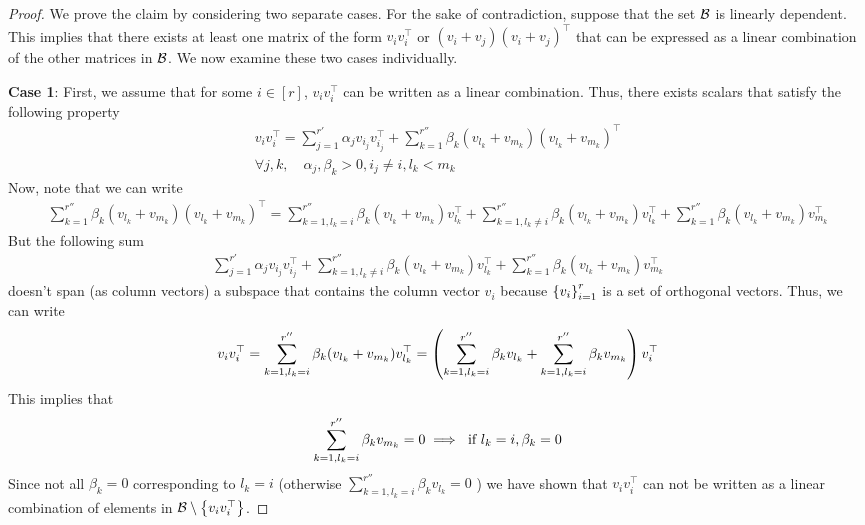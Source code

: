 \begin{proof}
    We prove the claim by considering two separate cases. For the sake of contradiction, suppose that the set ${\mathcal{B}}$ is linearly dependent. This implies that there exists at least one matrix of the form $v_i v_i^{\top}$ or $(v_i + v_j)(v_i + v_j)^{\top}$ that can be expressed as a linear combination of the other matrices in ${\mathcal{B}}$. We now examine these two cases individually.
    
    \textbf{Case 1}: First, we assume that for some $i \in [r]$, $v_iv_i^{\top}$ can be written as a linear combination. Thus, there exists scalars that satisfy the following property
    \begin{gather}
        v_iv_i^{\top} = \sum_{j = 1}^{r'} \alpha_{j}v_{i_j}v_{i_j}^{\top} + \sum_{k = 1}^{r''} \beta_{k}(v_{l_k} + v_{m_k})(v_{l_k} + v_{m_k})^{\top}\\
        \forall j,k,\quad \alpha_j, \beta_k > 0, i_j \neq i, l_k < m_k
    \end{gather}
    Now, note that we can write
    \begin{align*}
       \sum_{k = 1}^{r''} \beta_{k}(v_{l_k} + v_{m_k})(v_{l_k} + v_{m_k})^{\top} =  \sum_{k = 1, l_k = i}^{r''} \beta_{k}(v_{l_k} + v_{m_k})v_{l_k}^{\top} + \sum_{k = 1, l_k \neq i}^{r''} \beta_{k}(v_{l_k} + v_{m_k})v_{l_k}^{\top} + \sum_{k = 1}^{r''} \beta_{k}(v_{l_k} + v_{m_k})v_{m_k}^{\top}
    \end{align*}
    But the following sum 
    \begin{align*}
        \sum_{j = 1}^{r'} \alpha_{j}v_{i_j}v_{i_j}^{\top} + \sum_{k = 1, l_k \neq i}^{r''} \beta_{k}(v_{l_k} + v_{m_k})v_{l_k}^{\top} + \sum_{k = 1}^{r''} \beta_{k}(v_{l_k} + v_{m_k})v_{m_k}^{\top}
    \end{align*}
    doesn't span (as column vectors) a subspace that contains the column vector $v_i$ because $\left\{v_i\right\}_{i=1}^r$ is a set of orthogonal vectors. Thus, we can write
    \begin{align}
        v_iv_i^{\top} = \sum_{k = 1, l_k = i}^{r''} \beta_{k}(v_{l_k} + v_{m_k})v_{l_k}^{\top} =  \left( {\sum_{k = 1, l_k = i}^{r''} \beta_k v_{l_k} + \sum_{k = 1, l_k = i}^{r''} \beta_k v_{m_k}} \right) v_i^{\top} \label{eq: v1}
    \end{align}
    This implies that 
    \begin{align}
        \sum_{k = 1, l_k = i}^{r''} \beta_k v_{m_k} = 0 \implies \textnormal{ if } l_k = i, \beta_k = 0 \label{eq: v2}
    \end{align}
    Since not all $\beta_k = 0$ corresponding to $l_k = i$ (otherwise $\sum_{k = 1, l_k = i}^{r''} \beta_k v_{l_k} = 0$ ) we have shown that $v_iv_i^{\top}$ can not be written as a linear combination of elements in ${\mathcal{B}} \setminus \left\{v_iv_i^\top\right\}$.


\end{proof}

